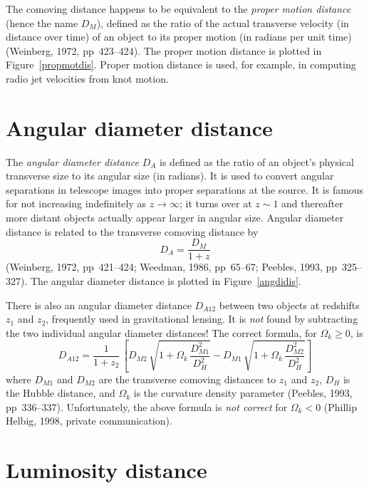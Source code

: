The comoving distance happens to be equivalent to the {\em proper
motion distance\/} (hence the name $D_M$), defined as the ratio of the
actual transverse velocity (in distance over time) of an object to its
proper motion (in radians per unit time) (Weinberg, 1972,
pp~423--424).  The proper motion distance is plotted in
Figure~\ref{propmotdis}.  Proper motion distance is used, for example,
in computing radio jet velocities from knot motion.


\section{Angular diameter distance}

The {\em angular diameter distance\/} $D_A$ is defined as the ratio of
an object's physical transverse size to its angular size (in radians).
It is used to convert angular separations in telescope images into
proper separations at the source.  It is famous for not increasing
indefinitely as $z\rightarrow\infty$; it turns over at $z\sim 1$ and
thereafter more distant objects actually appear larger in angular
size.  Angular diameter distance is related to the transverse comoving
distance by
\begin{equation}
D_A = \frac{D_M}{1+z}
\end{equation}
(Weinberg, 1972, pp~421--424; Weedman, 1986, pp~65--67; Peebles,
1993, pp~325--327).  The angular diameter distance is plotted in
Figure~\ref{angdidis}.

There is also an angular diameter distance $D_{A12}$ between two
objects at redshifts $z_1$ and $z_2$, frequently used in gravitational
lensing.  It is {\em not\/} found by subtracting the two individual
angular diameter distances!  The correct formula, for $\Omega_k\geq
0$, is
\begin{equation}
D_{A12}= \frac{1}{1+z_2}\,\left[
 D_{M2}\,\sqrt{1+\Omega_k\,\frac{D_{M1}^2}{D_H^2}}
 - D_{M1}\,\sqrt{1+\Omega_k\,\frac{D_{M2}^2}{D_H^2}}\right]
\end{equation}
where $D_{M1}$ and $D_{M2}$ are the transverse comoving distances to
$z_1$ and $z_2$, $D_H$ is the Hubble distance, and $\Omega_k$ is the
curvature density parameter (Peebles, 1993, pp~336--337).
Unfortunately, the above formula is {\em not correct\/} for
$\Omega_k<0$ (Phillip Helbig, 1998, private communication).


\section{Luminosity distance}

